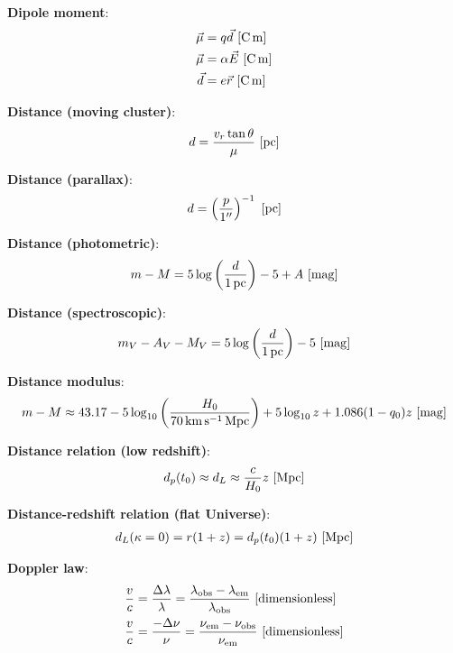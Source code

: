 \documentclass[a4paper,10pt]{article}
\begin{document}
{\noindent}\textbf{Dipole moment}:
\begin{align*}
    \vec{\mu} &= q\vec{d} ~ [{\rm C\,m}] \\
    \vec{\mu} &= \alpha\vec{E} ~ [{\rm C\,m}] \\
    \vec{d} &= e\vec{r} ~ [{\rm C\,m}]
\end{align*}

{\noindent}\textbf{Distance (moving cluster)}:
\begin{align*}
    d = \frac{v_r\tan\theta}{\mu} ~ [{\rm pc}]
\end{align*}

{\noindent}\textbf{Distance (parallax)}:
\begin{align*}
    d = \left(\frac{p}{1''}\right)^{-1} ~ {[\rm pc]}
\end{align*}

{\noindent}\textbf{Distance (photometric)}:
\begin{align*}
    m-M = 5\log\left(\frac{d}{1\,{\rm pc}}\right)-5+A ~ [{\rm mag}]
\end{align*}

{\noindent}\textbf{Distance (spectroscopic)}:
\begin{align*}
    m_V-A_V-M_V = 5\log\left(\frac{d}{1\,{\rm pc}}\right)-5 ~ [{\rm mag}]
\end{align*}

{\noindent}\textbf{Distance modulus}:
\begin{align*}
    m - M \approx 43.17 - 5\log_{10} \left(\frac{H_0}{70\,{\rm km\,s^{-1}\,Mpc}}\right) + 5\log_{10}z + 1.086(1-q_0)z ~ [{\rm mag}]
\end{align*}

{\noindent}\textbf{Distance relation (low redshift)}:
\begin{align*}
    d_p(t_0) \approx d_L \approx \frac{c}{H_0}z ~ [{\rm Mpc}]
\end{align*}

{\noindent}\textbf{Distance-redshift relation (flat Universe)}:
\begin{align*}
    d_L(\kappa=0) = r(1+z) = d_p(t_0)(1+z) ~ [{\rm Mpc}]
\end{align*}

{\noindent}\textbf{Doppler law}:
\begin{align*}
    \frac{v}{c} &= \frac{\Delta\lambda}{\lambda} =  \frac{\lambda_\mathrm{obs}-\lambda_\mathrm{em}}{\lambda_\mathrm{obs}} ~ [{\rm dimensionless}] \\
    \frac{v}{c} &= \frac{-\Delta\nu}{\nu} =  \frac{\nu_\mathrm{em}-\nu_\mathrm{obs}}{\nu_\mathrm{em}} ~ [{\rm dimensionless}]
\end{align*}
\end{document}
